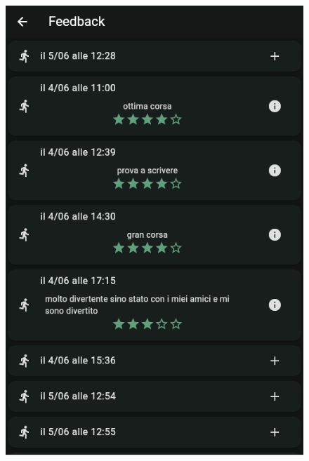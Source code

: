 \documentclass[a4paper,12pt]{article}
\begin{document}
\begin{figure}[H]
    \centering
    \begin{minipage}{0.32\textwidth}
        \centering
        \includegraphics[width=1\linewidth]{img/history.png}
    \end{minipage}
    \begin{minipage}{0.32\textwidth}
        \centering

\end{minipage}
\end{figure}
\end{document}
